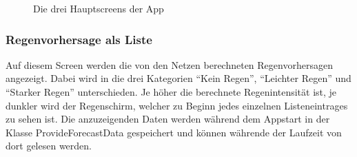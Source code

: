 \begin{figure}[H]
    \centering
    \caption{Die drei Hauptscreens der App}
\end{figure}

\subsubsection*{Regenvorhersage als Liste}
Auf diesem Screen werden die von den Netzen berechneten Regenvorhersagen angezeigt. 
Dabei wird in die drei Kategorien “Kein Regen”, “Leichter Regen” und “Starker Regen” unterschieden. 
Je höher die berechnete Regenintensität ist, je dunkler wird der Regenschirm, welcher zu Beginn jedes einzelnen Listeneintrages zu sehen ist.   
Die anzuzeigenden Daten werden während dem Appstart in der Klasse ProvideForecastData gespeichert und können währende der Laufzeit
von dort gelesen werden.


